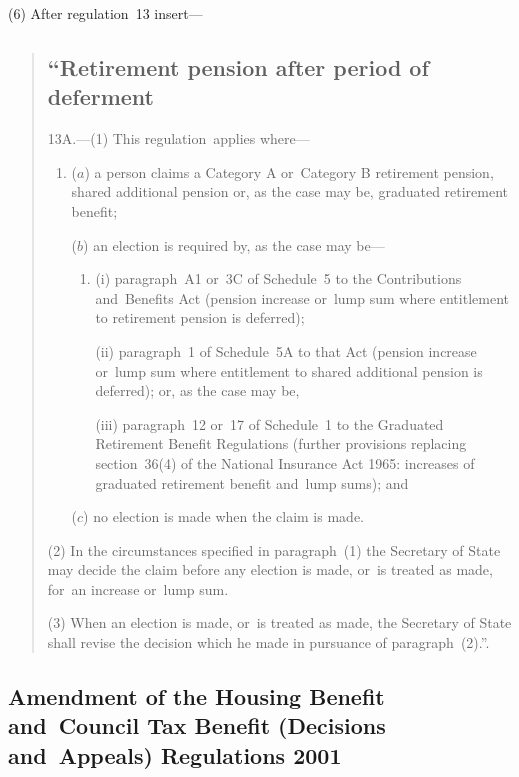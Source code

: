 \documentclass[12pt,a4paper]{article}
\begin{document}
(6) After regulation~13 insert—
\begin{quotation}
\subsection*{“Retirement pension after period of deferment}

13A.---(1)  This regulation~applies where—
\begin{enumerate}\item[]
($a$) a person claims a Category A or~Category B retirement pension, shared additional pension or, as the case may be, graduated retirement benefit;

($b$) an election is required by, as the case may be—
\begin{enumerate}\item[]
(i) paragraph~A1 or~3C of Schedule~5 to the Contributions and~Benefits Act (pension increase or~lump sum where entitlement to retirement pension is deferred);

(ii) paragraph~1 of Schedule~5A to that Act (pension increase or~lump sum where entitlement to shared additional pension is deferred); or, as the case may be,

(iii) paragraph~12 or~17 of Schedule~1 to the Graduated Retirement Benefit Regulations (further provisions replacing section~36(4) of the National Insurance Act 1965: increases of graduated retirement benefit and~lump sums); and 
\end{enumerate}

($c$) no election is made when the claim is made.
\end{enumerate}

(2) In the circumstances specified in paragraph~(1) the Secretary of State may decide the claim before any election is made, or~is treated as made, for~an increase or~lump sum.

(3) When an election is made, or~is treated as made, the Secretary of State shall revise the decision which he made in pursuance of paragraph~(2).”.
\end{quotation}

\subsection[10. Amendment of the Housing Benefit and~Council Tax Benefit (Decisions and~Appeals) Regulations 2001]{Amendment of the Housing Benefit and~Council Tax Benefit (Decisions and~Appeals) Regulations 2001}
\end{document}
